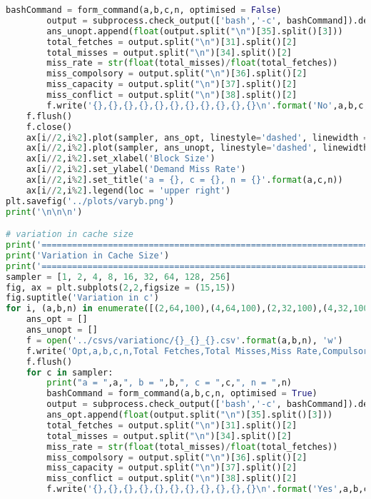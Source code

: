 \documentclass[12pt, a4paper]{article}
\begin{document}
\begin{lstlisting}[language=Python]
		bashCommand = form_command(a,b,c,n, optimised = False)
		output = subprocess.check_output(['bash','-c', bashCommand]).decode('utf8')
		ans_unopt.append(float(output.split("\n")[35].split()[3]))
		total_fetches = output.split("\n")[31].split()[2]
		total_misses = output.split("\n")[34].split()[2]
		miss_rate = str(float(total_misses)/float(total_fetches))
		miss_compolsory = output.split("\n")[36].split()[2]
		miss_capacity = output.split("\n")[37].split()[2]
		miss_conflict = output.split("\n")[38].split()[2]
		f.write('{},{},{},{},{},{},{},{},{},{},{}\n'.format('No',a,b,c,n,total_fetches,total_misses,miss_rate,miss_compolsory,miss_conflict,miss_capacity))
	f.flush()
	f.close()
	ax[i//2,i%2].plot(sampler, ans_opt, linestyle='dashed', linewidth = 2, marker='o', markersize=4,label='optimised')
	ax[i//2,i%2].plot(sampler, ans_unopt, linestyle='dashed', linewidth = 2, marker='o', markersize=4,label='unoptimised')
	ax[i//2,i%2].set_xlabel('Block Size')
	ax[i//2,i%2].set_ylabel('Demand Miss Rate')
	ax[i//2,i%2].set_title('a = {}, c = {}, n = {}'.format(a,c,n))
	ax[i//2,i%2].legend(loc = 'upper right')
plt.savefig('../plots/varyb.png')
print('\n\n\n')

# variation in cache size
print('==============================================================================')
print('Variation in Cache Size')
print('==============================================================================')
sampler = [1, 2, 4, 8, 16, 32, 64, 128, 256]
fig, ax = plt.subplots(2,2,figsize = (15,15))
fig.suptitle('Variation in c')
for i, (a,b,n) in enumerate([(2,64,100),(4,64,100),(2,32,100),(4,32,100)]):
	ans_opt = []
	ans_unopt = []
	f = open('../csvs/variationc/{}_{}_{}.csv'.format(a,b,n), 'w')
	f.write('Opt,a,b,c,n,Total Fetches,Total Misses,Miss Rate,Compulsory miss, Conflict miss, Capacity miss\n')
	f.flush()
	for c in sampler:
		print("a = ",a,", b = ",b,", c = ",c,", n = ",n)
		bashCommand = form_command(a,b,c,n, optimised = True)
		output = subprocess.check_output(['bash','-c', bashCommand]).decode('utf8')
		ans_opt.append(float(output.split("\n")[35].split()[3]))
		total_fetches = output.split("\n")[31].split()[2]
		total_misses = output.split("\n")[34].split()[2]
		miss_rate = str(float(total_misses)/float(total_fetches))
		miss_compolsory = output.split("\n")[36].split()[2]
		miss_capacity = output.split("\n")[37].split()[2]
		miss_conflict = output.split("\n")[38].split()[2]
		f.write('{},{},{},{},{},{},{},{},{},{},{}\n'.format('Yes',a,b,c,n,total_fetches,total_misses,miss_rate,miss_compolsory,miss_conflict,miss_capacity))


\end{lstlisting}
\end{document}

